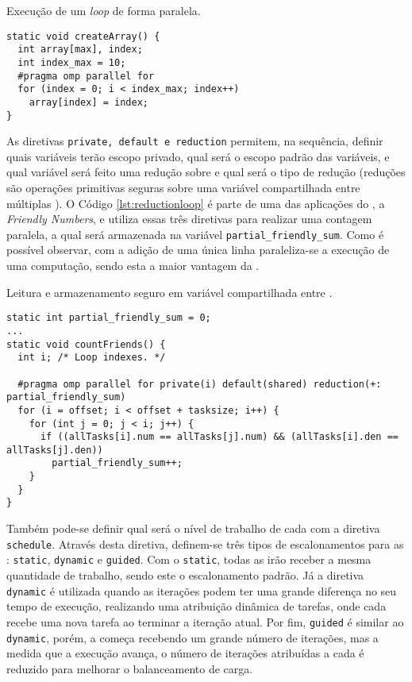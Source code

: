 \begin{listing}[tb]
\caption{Execução de um \textit{loop} de forma paralela.}
\label{lst:parallelloop}
\begin{verbatim}
static void createArray() {
  int array[max], index;
  int index_max = 10;
  #pragma omp parallel for
  for (index = 0; i < index_max; index++)
    array[index] = index;
}
\end{verbatim}
\end{listing}

As diretivas \texttt{private, default e reduction} permitem, na sequência, definir quais variáveis terão escopo privado, qual será o escopo padrão das variáveis, e qual variável será feito uma redução sobre e qual será o tipo de redução (reduções são operações primitivas seguras sobre uma variável compartilhada entre múltiplas \threads). O Código \ref{lst:reductionloop} é parte de uma das aplicações do \capb, a \textit{Friendly Numbers}, e utiliza essas três diretivas para realizar uma contagem paralela, a qual será armazenada na variável \texttt{partial\_friendly\_sum}. Como é possível observar, com a adição de uma única linha paraleliza-se a execução de uma computação, sendo esta a maior vantagem da \OpenMP.

\begin{listing}[tb]
\caption{Leitura e armazenamento seguro em variável compartilhada entre \threads.}
\label{lst:reductionloop}
\begin{verbatim}
static int partial_friendly_sum = 0;
...
static void countFriends() {
  int i; /* Loop indexes. */

  #pragma omp parallel for private(i) default(shared) reduction(+: partial_friendly_sum)
  for (i = offset; i < offset + tasksize; i++) {
    for (int j = 0; j < i; j++) {
      if ((allTasks[i].num == allTasks[j].num) && (allTasks[i].den == allTasks[j].den))
        partial_friendly_sum++;
    }
  }
}
\end{verbatim}
\end{listing}

Também pode-se definir qual será o nível de trabalho de cada \thread com a diretiva \texttt{schedule}. Através desta diretiva, definem-se três tipos de escalonamentos para as \threads: \texttt{static}, \texttt{dynamic} e \texttt{guided}. Com o \texttt{static}, todas as \threads irão receber a mesma quantidade de trabalho, sendo este o escalonamento padrão. Já a diretiva \texttt{dynamic} é utilizada quando as iterações podem ter uma grande diferença no seu tempo de execução, realizando uma atribuição dinâmica de tarefas, onde cada \thread recebe uma nova tarefa ao terminar a iteração atual. Por fim, \texttt{guided} é similar ao \texttt{dynamic}, porém, a \thread começa recebendo um grande número de iterações, mas a medida que a execução avança, o número de iterações atribuídas a cada \thread é reduzido para melhorar o balanceamento de carga.

